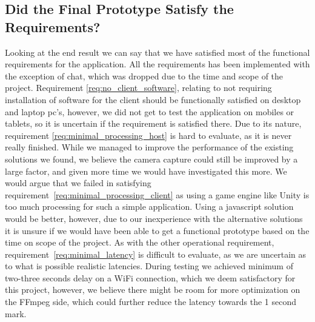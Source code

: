 \subsection{Did the Final Prototype Satisfy the Requirements?}
Looking at the end result we can say that we have satisfied most of the functional requirements for the application. All the requirements has been implemented with the exception of chat, which was dropped due to the time and scope of the project. Requirement \ref{req:no_client_software}, relating to not requiring installation of software for the client should be functionally satisfied on desktop and laptop pc's, however, we did not get to test the application on mobiles or tablets, so it is uncertain if the requirement is satisfied there. 
Due to its nature, requirement \ref{req:minimal_processing_host} is hard to evaluate, as it is never really finished. While we managed to improve the performance of the existing solutions we found, we believe the camera capture could still be improved by a large factor, and given more time we would have investigated this more.
We would argue that we failed in satisfying requirement~\ref{req:minimal_processing_client} as using a game engine like Unity is too much processing for such a simple application. Using a javascript solution would be better, however, due to our inexperience with the alternative solutions it is unsure if we would have been able to get a functional prototype based on the time on scope of the project.
As with the other operational requirement, requirement~\ref{req:minimal_latency} is difficult to evaluate, as we are uncertain as to what is possible realistic latencies. During testing we achieved minimum of two-three seconds delay on a WiFi connection, which we deem satisfactory for this project, however, we believe there might be room for more optimization on the FFmpeg side, which could further reduce the latency towards the 1 second mark.





